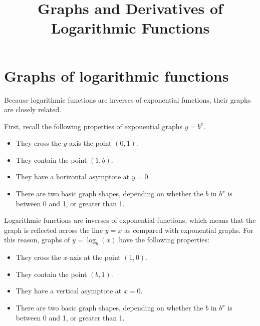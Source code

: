 \documentclass{ximera}
\title{Graphs and Derivatives of Logarithmic Functions}
\begin{document}
\begin{abstract}
\end{abstract}
\maketitle

\section{Graphs of logarithmic functions}

Because logarithmic functions are inverses of exponential functions, their graphs are closely related. 

First, recall the following properties of exponential graphs $y=b^x$.

\begin{itemize}
\item They cross the $y$-axis the point $(0,1)$.
\item They contain the point $(1,b)$.
\item They have a horizontal asymptote at $y=0$.
\item There are two basic graph shapes, depending on whether the $b$ in $b^x$ is between 0 and 1, or greater than 1.
\end{itemize}

Logarithmic functions are inverses of exponential functions, which means that the graph is reflected across the line $y=x$ as compared with exponential graphs. For this reason, graphs of $y=\log_b(x)$ have the following properties:

\begin{itemize}
\item They cross the $x$-axis at the point $(1,0)$.
\item They contain the point $(b,1)$.
\item They have a vertical asymptote at $x=0$.
\item There are two basic graph shapes, depending on whether the $b$ in $b^x$ is between 0 and 1, or greater than 1.
\end{itemize}
\end{document}
